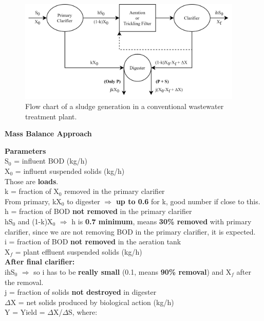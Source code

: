 \documentclass{article}
\numberwithin{equation}{section}
\begin{document}
\begin{figure}[htbp]
    \centering
    \includegraphics[width=0.95\textwidth]{SludgeQuantities.png} %
    \caption{Flow chart of a sludge generation in a conventional wastewater treatment plant.}
    \label{fig:sludge}
\end{figure}
\begin{center}\textbf{\Large Mass Balance Approach}\end{center}
\textbf{\large Parameters}\\
S$_0$ = influent BOD (kg/h)\\
X$_0$ = influent suspended solids (kg/h)\\
Those are \textbf{loads}.\\
k = fraction of X$_0$ removed in the primary clarifier\\
From primary, kX$_0$ to digester $\Rightarrow$ \textbf{up to 0.6} for k, good number if close to this.\\
h = fraction of BOD \textbf{not removed} in the primary clarifier\\
hS$_0$ and (1-k)X$_0$ $\Rightarrow$ h is \textbf{0.7 minimum}, means \textbf{30\% removed} with primary clarifier, since we are not removing BOD in the primary clarifier, it is expected.\\
i = fraction of BOD \textbf{not removed} in the aeration tank\\
X$_f$ = plant effluent suspended solids (kg/h)\\
\textbf{After final clarifier:}\\
ihS$_0$ $\Rightarrow$ so i has to be \textbf{really small} (0.1, means \textbf{90\% removal}) and X$_f$ after the removal.\\
j = fraction of solids \textbf{not destroyed} in digester\\
$\Delta$X = net solids produced by biological action (kg/h)\\
Y = Yield = $\Delta$X/$\Delta$S, where:\\
\end{document}
